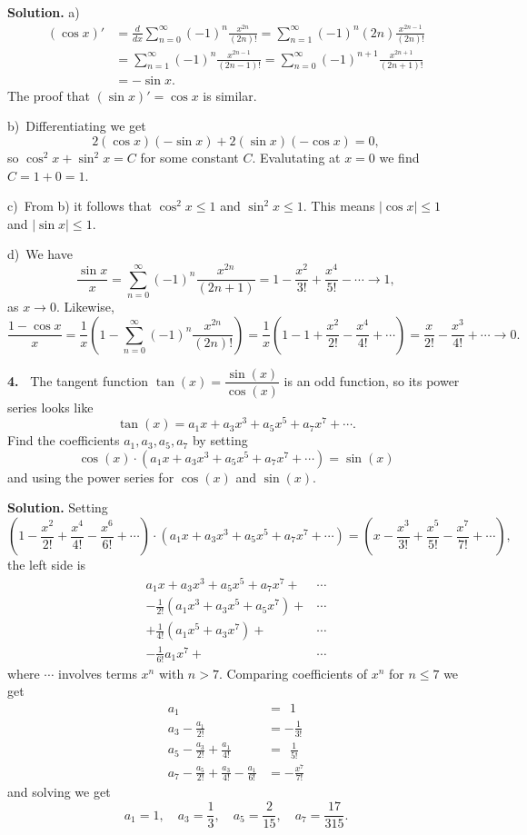 \documentclass[12pt]{article}
\theoremstyle{definition}
\theoremstyle{remark}
\theoremstyle{definition}
\newenvironment{Solution}{\noindent\textbf{Solution.}}{}
\begin{document}
\begin{Solution}
a)\ 
\[\begin{split}
(\cos x)'&=\frac{d}{dx}\sum_{n=0}^\infty (-1)^n\frac{x^{2n}}{(2n)!}
=\sum_{n=1}^\infty (-1)^n(2n)\frac{x^{2n-1}}{(2n)!}\\
&=\sum_{n=1}^\infty (-1)^n\frac{x^{2n-1}}{(2n-1)!}
=\sum_{n=0}^\infty (-1)^{n+1}\frac{x^{2n+1}}{(2n+1)!}\\
&=-\sin x. 
\end{split}
\]
The proof that $(\sin x)'=\cos x$ is similar. 

b)\ Differentiating we get
\[2(\cos x)(-\sin x)+2(\sin x)(-\cos x)=0,\]
so 
$\cos^2x+\sin^2 x=C$ for some constant $C$. Evalutating at $x=0$ we find $C=1+0=1$.

c)\ From b) it follows that $\cos^2x\leq 1$ and $\sin^2x\leq 1$. This means $|\cos x|\leq 1$ and $|\sin x|\leq 1$. 

d)\ We have 
\[
\frac{\sin x}{x}=\sum_{n=0}^\infty(-1)^n\frac{x^{2n}}{(2n+1)}=1-\frac{x^2}{3!}+\frac{x^4}{5!}-\cdots\to 1,
\] 
as $x\to 0$. Likewise, 
\[
\frac{1-\cos x}{x}
=\frac{1}{x}\left(1-\sum_{n=0}^\infty(-1)^n\frac{x^{2n}}{(2n)!}\right)
=\frac{1}{x}\left(1-1+\frac{x^2}{2!}-\frac{x^4}{4!}+\cdots\right)
=\frac{x}{2!}-\frac{x^3}{4!}+\cdots\to 0.
\] 
\end{Solution}

{\bf 4.\ } The tangent function $\tan(x)=\dfrac{\sin(x)}{\cos(x)}$ is an odd function, so its power series looks like
\[\tan(x)=a_1x+a_3x^3+a_5x^5+a_7x^7+\cdots.\]
Find the  coefficients $a_1, a_3, a_5, a_7$ by setting 
\[\cos(x)\cdot(a_1x+a_3x^3+a_5x^5+a_7x^7+\cdots)=\sin(x)\]
and using the power series for $\cos(x)$ and $\sin(x)$. 

\begin{Solution}
Setting
\[
\left(1-\frac{x^2}{2!}+\frac{x^4}{4!}-\frac{x^6}{6!}+\cdots\right)\cdot
\left(a_1x+a_3x^3+a_5x^5+a_7x^7+\cdots\right)=
\left(x-\frac{x^3}{3!}+\frac{x^5}{5!}-\frac{x^7}{7!}+\cdots\right),
\]
the left side is 
\[\begin{split}
a_1x+a_3x^3+a_5x^5+a_7x^7+&\cdots\\
-\frac{1}{2!}(a_1x^3+a_3x^5+a_5x^7)+&\cdots\\
+\frac{1}{4!}(a_1x^5+a_3x^7)+&\cdots\\
-\frac{1}{6!}a_1x^7+&\cdots
\end{split}
\]
where $\cdots$ involves terms $x^n$ with $n>7$. 
Comparing coefficients of $x^n$ for $n\leq 7$ we get
\[\begin{split}
a_1&=\ \ 1\\
 a_3-\frac{a_1}{2!}&=-\frac{1}{3!}\\
a_5-\frac{a_3}{2!}+\frac{a_1}{4!}&=\ \ \frac{1}{5!}\\
a_7-\frac{a_5}{2!}+\frac{a_3}{4!}-\frac{a_1}{6!}&=-\frac{x^7}{7!}
\end{split}
\]
and solving we get
\[a_1=1,\quad  a_3=\frac{1}{3},\quad a_5=\frac{2}{15},\quad a_7=\frac{17}{315}.\]
\end{Solution}
\end{document}

